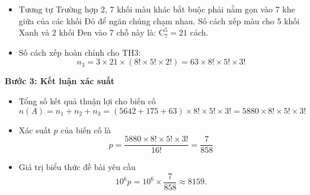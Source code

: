 \begin{ex}
{		\begin{itemize}
			\item Tương tự Trường hợp 2, 7 khối màu khác bắt buộc phải nằm gọn vào 7 khe giữa của các khối Đỏ để ngăn chúng chạm nhau. Số cách xếp màu cho 5 khối Xanh và 2 khối Đen vào 7 chỗ này là: $\mathrm{C}_{7}^{5} = 21$ cách.
			\item Số cách xếp hoàn chỉnh cho TH3:
			\[ n_3 = 3 \times 21 \times (8! \times 5! \times 2!) = 63 \times 8! \times 5! \times 3! \]
		\end{itemize}
		
		\vfill
		\textbf{Bước 3: Kết luận xác suất}
		\begin{itemize}
			\item Tổng số kết quả thuận lợi cho biến cố
			\[ n(A) = n_1 + n_2 + n_3 = (5642 + 175 + 63) \times 8! \times 5! \times 3! = 5880 \times 8! \times 5! \times 3! \]
			\item Xác suất $p$ của biến cố là
			\[ p = \dfrac{5880 \times 8! \times 5! \times 3!}{16!} = \dfrac{7}{858} \]
			\item Giá trị biểu thức đề bài yêu cầu
			\[ 10^6 p = 10^6 \times \dfrac{7}{858} \approx 8159.\]
		\end{itemize}
	}
\end{ex}